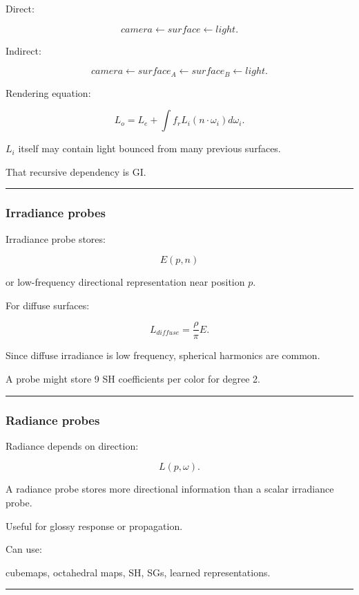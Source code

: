 Direct:

\[
camera
\leftarrow
surface
\leftarrow
light.
\]

Indirect:

\[
camera
\leftarrow
surface_A
\leftarrow
surface_B
\leftarrow
light.
\]

Rendering equation:

\[
L_o=
L_e+
\int
f_rL_i(n\cdot\omega_i)d\omega_i.
\]

\(L_i\) itself may contain light bounced from many previous surfaces.

That recursive dependency is GI.

\begin{center}\rule{0.5\linewidth}{0.5pt}\end{center}

\subsubsection{Irradiance probes}\label{irradiance-probes}

Irradiance probe stores:

\[
E(p,n)
\]

or low-frequency directional representation near position \(p\).

For diffuse surfaces:

\[
L_{diffuse}
=
\frac{\rho}{\pi}
E.
\]

Since diffuse irradiance is low frequency, spherical harmonics are common.

A probe might store 9 SH coefficients per color for degree 2.

\begin{center}\rule{0.5\linewidth}{0.5pt}\end{center}

\subsubsection{Radiance probes}\label{radiance-probes}

Radiance depends on direction:

\[
L(p,\omega).
\]

A radiance probe stores more directional information than a scalar irradiance probe.

Useful for glossy response or propagation.

Can use:

cubemaps, octahedral maps, SH, SGs, learned representations.

\begin{center}\rule{0.5\linewidth}{0.5pt}\end{center}

